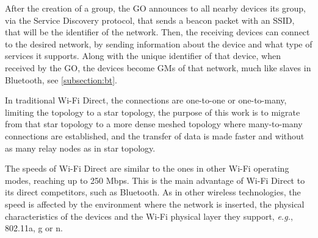 After the creation of a group, the \gls{GO} announces to all nearby devices its group, via the Service Discovery protocol, that sends a beacon packet with an \gls{SSID}, that will be the identifier of the network. Then, the receiving devices can connect to the desired network, by sending information about the device and what type of services it supports. Along with the unique identifier of that device, when received by the \gls{GO}, the devices become \glspl{GM} of that network, much like slaves in Bluetooth, see \ref{subsection:bt}.

In traditional Wi-Fi Direct, the connections are one-to-one or one-to-many, limiting the topology to a star topology, the purpose of this work is to migrate from that star topology to a more dense meshed topology where many-to-many connections are established, and the transfer of data is made faster and without as many relay nodes as in star topology.

The speeds of Wi-Fi Direct are similar to the ones in other Wi-Fi operating modes, reaching up to 250 Mbps. This is the main advantage of Wi-Fi Direct to its direct competitors, such as Bluetooth. As in other wireless technologies, the speed is affected by the environment where the network is inserted, the physical characteristics of the devices and the Wi-Fi physical layer they support, \textit{e.g.}, 802.11a, g or n.

